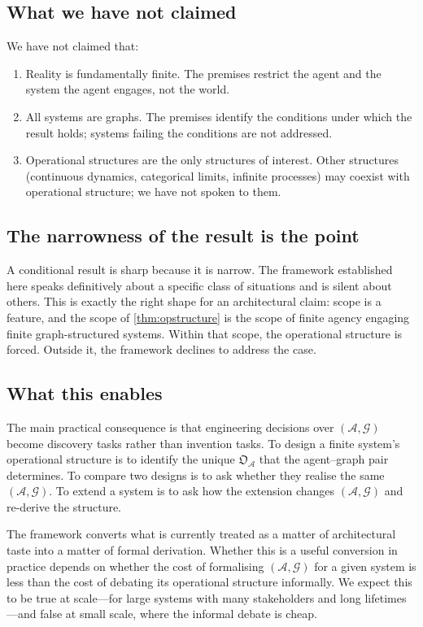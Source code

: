\documentclass[11pt,a4paper]{article}
\theoremstyle{thmstyle}
\theoremstyle{definition}
\theoremstyle{remark}
\newcommand{\Graph}{\mathcal{G}}
\newcommand{\Agent}{\mathcal{A}}
\newcommand{\OpStr}{\mathfrak{O}}
\begin{document}
\subsection{What we have not claimed}

We have not claimed that:
\begin{enumerate}[nosep,leftmargin=*]
\item Reality is fundamentally finite. The premises restrict the
agent and the system the agent engages, not the world.
\item All systems are graphs. The premises identify the conditions
under which the result holds; systems failing the conditions are
not addressed.
\item Operational structures are the only structures of interest.
Other structures (continuous dynamics, categorical limits, infinite
processes) may coexist with operational structure; we have not
spoken to them.
\end{enumerate}

\subsection{The narrowness of the result is the point}

A conditional result is sharp because it is narrow. The framework
established here speaks definitively about a specific class of
situations and is silent about others. This is exactly the right
shape for an architectural claim: scope is a feature, and the scope
of \cref{thm:opstructure} is the scope of finite agency engaging
finite graph-structured systems. Within that scope, the operational
structure is forced. Outside it, the framework declines to address
the case.

\subsection{What this enables}

The main practical consequence is that engineering decisions over
$(\Agent, \Graph)$ become discovery tasks rather than invention
tasks. To design a finite system's operational structure is to
identify the unique $\OpStr_\Agent$ that the agent--graph pair
determines. To compare two designs is to ask whether they realise
the same $(\Agent, \Graph)$. To extend a system is to ask how the
extension changes $(\Agent, \Graph)$ and re-derive the structure.

The framework converts what is currently treated as a matter of
architectural taste into a matter of formal derivation. Whether
this is a useful conversion in practice depends on whether the cost
of formalising $(\Agent, \Graph)$ for a given system is less than
the cost of debating its operational structure informally. We
expect this to be true at scale---for large systems with many
stakeholders and long lifetimes---and false at small scale, where
the informal debate is cheap.
\end{document}
